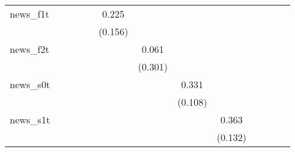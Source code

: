 {\begin{tabular}{l*{12}{c}}
\addlinespace
news\_f1t    &                     &                     &                     &                     &       0.225         &                     &                     &                     &                     &                     &                     &                     \\
            &                     &                     &                     &                     &     (0.156)         &                     &                     &                     &                     &                     &                     &                     \\
\addlinespace
news\_f2t    &                     &                     &                     &                     &                     &       0.061         &                     &                     &                     &                     &                     &                     \\
            &                     &                     &                     &                     &                     &     (0.301)         &                     &                     &                     &                     &                     &                     \\
\addlinespace
news\_s0t    &                     &                     &                     &                     &                     &                     &       0.331\sym{***}&                     &                     &                     &                     &                     \\
            &                     &                     &                     &                     &                     &                     &     (0.108)         &                     &                     &                     &                     &                     \\
\addlinespace
news\_s1t    &                     &                     &                     &                     &                     &                     &                     &       0.363\sym{***}&                     &                     &                     &                     \\
            &                     &                     &                     &                     &                     &                     &                     &     (0.132)         &                     &                     &                     &                     \\

\end{tabular}}
